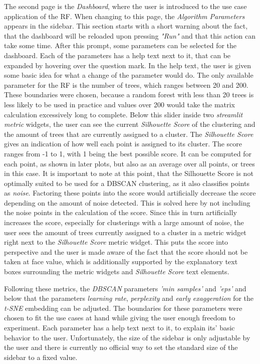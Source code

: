 \documentclass[a4paper, 12pt]{article}
\begin{document}
The second page is the \textit{Dashboard}, where the user is introduced to the use case application
of the RF. When changing to this page, the \textit{Algorithm Parameters} appears in the sidebar. This
section starts with a short warning about the fact, that the dashboard will be reloaded upon pressing
\textit{"Run"} and that this action can take some time.
After this prompt, some parameters can be selected for the dashboard. Each of the parameters has a
help text next to it, that can be expanded by hovering over the question mark. In the help text,
the user is given some basic idea for what a change of the parameter would do.
The only available parameter for
the RF is the number of trees, which ranges between 20 and 200. These boundaries were chosen, because
a random forest with less than 20 trees is less likely to be used in practice and values over 200
would take the matrix calculation excessively long to complete.
Below this slider inside two \textit{streamlit metric} widgets, the user can see the current
\textit{Silhouette Score} \cite{rousseeuw1987silhouettes} of the clustering and the amount of trees that
are currently assigned to a cluster. The \textit{Silhouette Score} gives an indication of how well each
point is assigned to its cluster. The score ranges from -1 to 1, with 1 being the best possible score.
It can be computed for each point, as shown in later plots, but also as an average over all points, or
trees in this case. It is important to note at this point, that the Silhouette Score is not optimally
suited to be used for a DBSCAN clustering, as it also classifies points as \textit{noise}. Factoring
these points into the score would artificially decrease the score depending on the amount of noise
detected. This is solved here by not including the noise points in the calculation of the score.
Since this in turn artificially increases the score, especially for clusterings with a large amount of
noise, the user sees the amount of trees currently assigned to a cluster in a metric widget right next
to the \textit{Silhouette Score} metric widget. This puts the score into perspective and the user is
made aware of the fact that the score should not be taken at face value, which is additionally supported
by the explanatory text boxes surrounding the metric widgets and \textit{Silhouette Score} text elements.
\par

Following these metrics, the \textit{DBSCAN} parameters \textit{'min samples'} and \textit{'eps'} and
below that the parameters \textit{learning rate}, \textit{perplexity} and \textit{early exaggeration} for
the \textit{t-SNE} embedding can be adjusted. The boundaries for these parameters were chosen to fit the
use cases at hand while giving the user enough freedom to experiment. Each parameter has a help text next
to it, to explain its' basic behavior to the user.
Unfortunately, the size of the sidebar is only adjustable by the user and there is currently no
official way to set the standard size of the sidebar to a fixed value. \par
\end{document}
